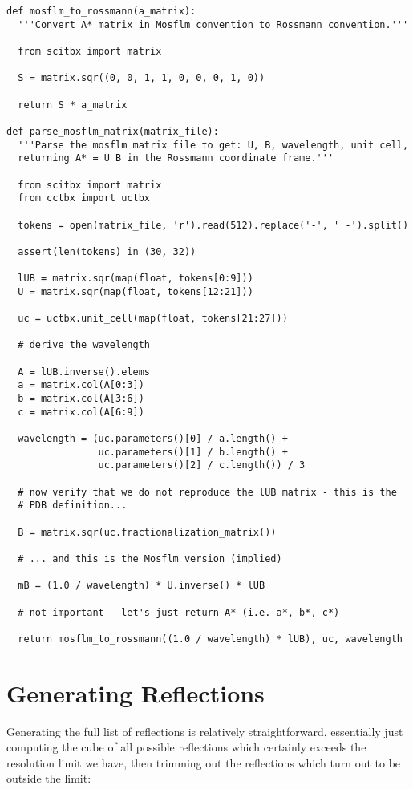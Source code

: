 \documentclass[a4paper, 11pt]{article}
\begin{document}
{\small
\begin{verbatim}
def mosflm_to_rossmann(a_matrix):
  '''Convert A* matrix in Mosflm convention to Rossmann convention.'''

  from scitbx import matrix
    
  S = matrix.sqr((0, 0, 1, 1, 0, 0, 0, 1, 0))

  return S * a_matrix

def parse_mosflm_matrix(matrix_file):
  '''Parse the mosflm matrix file to get: U, B, wavelength, unit cell,
  returning A* = U B in the Rossmann coordinate frame.'''

  from scitbx import matrix
  from cctbx import uctbx

  tokens = open(matrix_file, 'r').read(512).replace('-', ' -').split()

  assert(len(tokens) in (30, 32))

  lUB = matrix.sqr(map(float, tokens[0:9]))
  U = matrix.sqr(map(float, tokens[12:21]))
    
  uc = uctbx.unit_cell(map(float, tokens[21:27]))

  # derive the wavelength

  A = lUB.inverse().elems
  a = matrix.col(A[0:3])
  b = matrix.col(A[3:6])
  c = matrix.col(A[6:9])

  wavelength = (uc.parameters()[0] / a.length() +
                uc.parameters()[1] / b.length() +
                uc.parameters()[2] / c.length()) / 3

  # now verify that we do not reproduce the lUB matrix - this is the
  # PDB definition...

  B = matrix.sqr(uc.fractionalization_matrix())

  # ... and this is the Mosflm version (implied)

  mB = (1.0 / wavelength) * U.inverse() * lUB

  # not important - let's just return A* (i.e. a*, b*, c*)

  return mosflm_to_rossmann((1.0 / wavelength) * lUB), uc, wavelength
\end{verbatim}
}

\section{Generating Reflections}

Generating the full list of reflections is relatively straightforward, essentially just computing the cube of all possible reflections which certainly exceeds the resolution limit we have, then trimming out the reflections which turn out to be outside the limit:
\end{document}
